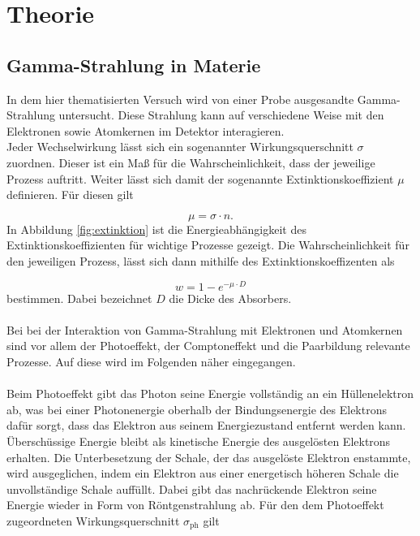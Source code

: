 \section{Theorie}
\label{sec:Theorie}


\subsection{Gamma-Strahlung in Materie}
\label{subsec:t1}

In dem hier thematisierten Versuch wird von einer Probe ausgesandte Gamma-Strahlung untersucht.
Diese Strahlung kann auf verschiedene Weise mit den Elektronen sowie Atomkernen im Detektor
interagieren.\\
Jeder Wechselwirkung lässt sich ein sogenannter Wirkungsquerschnitt
$\sigma$ zuordnen. Dieser ist ein Maß für die Wahrscheinlichkeit,
dass der jeweilige Prozess auftritt. Weiter lässt sich damit der sogenannte Extinktionskoeffizient $\mu$ definieren.
Für diesen gilt

\begin{equation}
  \label{eqn:extinktion}
  \mu = \sigma \cdot n .
\end{equation}
In Abbildung \ref{fig:extinktion} ist die Energieabhängigkeit des Extinktionskoeffizienten für wichtige
Prozesse gezeigt.
Die Wahrscheinlichkeit für den jeweiligen Prozess, lässt sich dann mithilfe des Extinktionskoeffizenten als

\begin{equation}
  \label{eqn:wkeit}
  w = 1 - e^{-\mu \cdot D}
\end{equation}
bestimmen. Dabei bezeichnet $D$ die Dicke des Absorbers.\\ \\
Bei bei der Interaktion von Gamma-Strahlung mit Elektronen und Atomkernen sind vor allem
der Photoeffekt, der Comptoneffekt und die Paarbildung relevante
Prozesse. Auf diese wird im Folgenden näher eingegangen.\\ \\
Beim Photoeffekt gibt das Photon seine Energie vollständig an ein Hüllenelektron ab, was bei
einer Photonenergie oberhalb der Bindungsenergie des Elektrons dafür sorgt, dass das Elektron
aus seinem Energiezustand entfernt werden kann. Überschüssige Energie bleibt als kinetische
Energie des ausgelösten Elektrons erhalten. Die Unterbesetzung der Schale, der das ausgelöste
Elektron enstammte, wird ausgeglichen, indem ein Elektron aus einer energetisch höheren Schale
die unvollständige Schale auffüllt. Dabei gibt das nachrückende Elektron seine Energie wieder
in Form von Röntgenstrahlung ab. Für den dem Photoeffekt zugeordneten Wirkungsquerschnitt $\sigma_\text{ph}$ gilt

